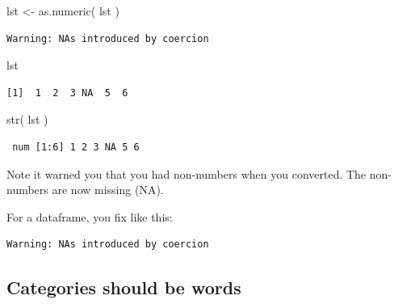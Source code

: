 \documentclass[
  letterpaper,
  DIV=11,
  numbers=noendperiod]{scrreprt}
\newenvironment{Shaded}{}{}
\newcommand{\FunctionTok}[1]{\textcolor[rgb]{0.02,0.16,0.49}{#1}}
\newcommand{\NormalTok}[1]{#1}
\newcommand{\OtherTok}[1]{\textcolor[rgb]{0.00,0.44,0.13}{#1}}
\newcommand{\SpecialCharTok}[1]{\textcolor[rgb]{0.25,0.44,0.63}{#1}}
\begin{document}
\begin{Shaded}
\begin{Highlighting}[]
\NormalTok{lst }\OtherTok{\textless{}{-}} \FunctionTok{as.numeric}\NormalTok{( lst )}
\end{Highlighting}
\end{Shaded}

\begin{verbatim}
Warning: NAs introduced by coercion
\end{verbatim}

\begin{Shaded}
\begin{Highlighting}[]
\NormalTok{lst}
\end{Highlighting}
\end{Shaded}

\begin{verbatim}
[1]  1  2  3 NA  5  6
\end{verbatim}

\begin{Shaded}
\begin{Highlighting}[]
\FunctionTok{str}\NormalTok{( lst )}
\end{Highlighting}
\end{Shaded}

\begin{verbatim}
 num [1:6] 1 2 3 NA 5 6
\end{verbatim}

Note it warned you that you had non-numbers when you converted. The
non-numbers are now missing (NA).

For a dataframe, you fix like this:

\begin{Shaded}
\end{Shaded}

\begin{verbatim}
Warning: NAs introduced by coercion
\end{verbatim}

\subsection{Categories should be
words}\label{categories-should-be-words}
\end{document}
